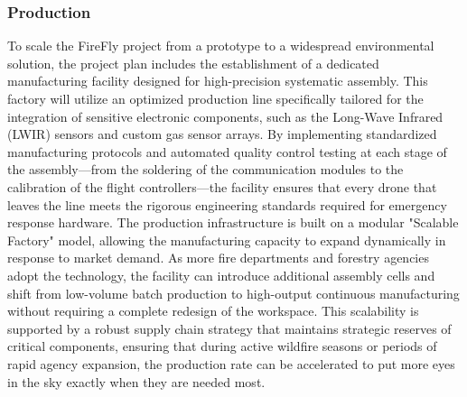 \documentclass[journal, onecolumn]{IEEEtran}
\begin{document}
\subsubsection{Production}
To scale the FireFly project from a prototype to a widespread environmental solution, the project plan includes the establishment of a dedicated manufacturing facility designed for high-precision systematic assembly. This factory will utilize an optimized production line specifically tailored for the integration of sensitive electronic components, such as the Long-Wave Infrared (LWIR) sensors and custom gas sensor arrays. By implementing standardized manufacturing protocols and automated quality control testing at each stage of the assembly—from the soldering of the communication modules to the calibration of the flight controllers—the facility ensures that every drone that leaves the line meets the rigorous engineering standards required for emergency response hardware.
The production infrastructure is built on a modular "Scalable Factory" model, allowing the manufacturing capacity to expand dynamically in response to market demand. As more fire departments and forestry agencies adopt the technology, the facility can introduce additional assembly cells and shift from low-volume batch production to high-output continuous manufacturing without requiring a complete redesign of the workspace. This scalability is supported by a robust supply chain strategy that maintains strategic reserves of critical components, ensuring that during active wildfire seasons or periods of rapid agency expansion, the production rate can be accelerated to put more eyes in the sky exactly when they are needed most.
\end{document}

